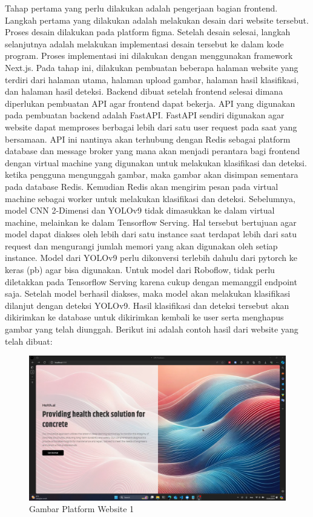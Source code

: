 Tahap pertama yang perlu dilakukan adalah pengerjaan bagian frontend. Langkah pertama yang dilakukan adalah melakukan desain dari website tersebut. Proses desain dilakukan pada platform figma. Setelah desain selesai, langkah selanjutnya adalah melakukan implementasi desain tersebut ke dalam kode program. Proses implementasi ini dilakukan dengan menggunakan framework Next.js. Pada tahap ini, dilakukan pembuatan beberapa halaman website yang terdiri dari halaman utama, halaman upload gambar, halaman hasil klasifikasi, dan halaman hasil deteksi. Backend dibuat setelah frontend selesai dimana diperlukan pembuatan API agar frontend dapat bekerja. API yang digunakan pada pembuatan backend adalah FastAPI. FastAPI sendiri digunakan agar website dapat memproses berbagai lebih dari satu user request pada saat yang bersamaan. API ini nantinya akan terhubung dengan Redis sebagai platform database dan message broker yang mana akan menjadi perantara bagi frontend dengan virtual machine yang digunakan untuk melakukan klasifikasi dan deteksi. ketika pengguna mengunggah gambar, maka gambar akan disimpan sementara pada database Redis. Kemudian Redis akan mengirim pesan pada virtual machine sebagai worker untuk melakukan klasifikasi dan deteksi. Sebelumnya, model CNN 2-Dimensi dan YOLOv9 tidak dimasukkan ke dalam virtual machine, melainkan ke dalam Tensorflow Serving. Hal tersebut bertujuan agar model dapat diakses oleh lebih dari satu instance saat terdapat lebih dari satu request dan mengurangi jumlah memori yang akan digunakan oleh setiap instance. Model dari YOLOv9 perlu dikonversi terlebih dahulu dari pytorch ke keras (pb) agar bisa digunakan. Untuk model dari Roboflow, tidak perlu diletakkan pada Tensorflow Serving karena cukup dengan memanggil endpoint saja. Setelah model berhasil diakses, maka model akan melakukan klasifikasi dilanjut dengan deteksi YOLOv9. Hasil klasifikasi dan deteksi tersebut akan dikirimkan ke database untuk dikirimkan kembali ke user serta menghapus gambar yang telah diunggah. Berikut ini adalah contoh hasil dari website yang telah dibuat:

\begin{minipage}{\linewidth}
  \begin{figure} [H] \centering
    \includegraphics[scale=0.15]{gambar/bab3/web1.png}
    \caption{Gambar Platform Website 1}
  \end{figure}
\end{minipage}

